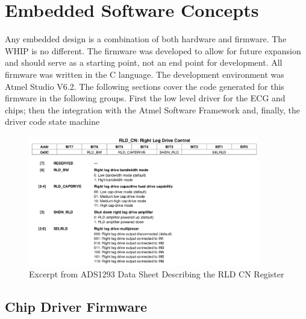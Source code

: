 \chapter{Embedded Software Concepts}
\label{chap:SensorConcepts}
Any embedded design is a combination of both hardware and firmware. The WHIP is no different. The firmware was developed to allow for future expansion and should serve as a starting point, not an end point for development. All firmware was written in the C language. The development environment was Atmel Studio V6.2\cite{AtmelStudio}. The following sections cover the code generated for this firmware in the following groups. First the low level driver for the ECG and  chips; then the integration with the Atmel Software Framework and, finally, the driver code state machine

\begin{figure}
	\begin{center}
		\includegraphics[scale=1,width=0.9\textwidth]{Images/ADS1293_RLD_CN_modified.png} 
		\caption{Excerpt from ADS1293 Data Sheet Describing the RLD CN Register}
		\label{fig:ADS1293_RLD_CN}
	\end{center}
\end{figure}

\section{Chip Driver Firmware}

